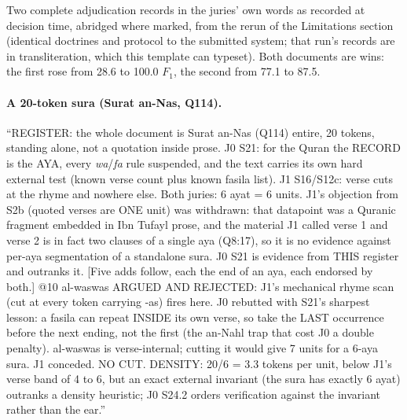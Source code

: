 \documentclass[11pt]{article}
\begin{document}
Two complete adjudication records in the juries' own words as recorded at decision
time, abridged where marked, from the rerun of the Limitations section (identical
doctrines and protocol to the submitted system; that run's records are in
transliteration, which this template can typeset). Both documents are wins: the first
rose from 28.6 to 100.0 $F_1$, the second from 77.1 to 87.5.

\paragraph{A 20-token sura (Surat an-Nas, Q114).}
\begin{tcolorbox}[colback=white, boxrule=0.4pt, left=3pt, right=3pt, top=3pt, bottom=3pt]
\scriptsize
``REGISTER: the whole document is Surat an-Nas (Q114) entire, 20 tokens, standing alone,
not a quotation inside prose. J0 S21: for the Quran the RECORD is the AYA, every
\textit{wa}/\textit{fa} rule suspended, and the text carries its own hard external test
(known verse count plus known fasila list). J1 S16/S12c: verse cuts at the rhyme and
nowhere else. Both juries: 6 ayat = 6 units. J1's objection from S2b (quoted verses are
ONE unit) was withdrawn: that datapoint was a Quranic fragment embedded in Ibn Tufayl
prose, and the material J1 called verse 1 and verse 2 is in fact two clauses of a single
aya (Q8:17), so it is no evidence against per-aya segmentation of a standalone sura. J0
S21 is evidence from THIS register and outranks it. [Five adds follow, each the end of an
aya, each endorsed by both.] @10 al-waswas ARGUED AND REJECTED: J1's mechanical rhyme
scan (cut at every token carrying -as) fires here. J0 rebutted with S21's sharpest
lesson: a fasila can repeat INSIDE its own verse, so take the LAST occurrence before the
next ending, not the first (the an-Nahl trap that cost J0 a double penalty). al-waswas is
verse-internal; cutting it would give 7 units for a 6-aya sura. J1 conceded. NO CUT.
DENSITY: 20/6 = 3.3 tokens per unit, below J1's verse band of 4 to 6, but an exact
external invariant (the sura has exactly 6 ayat) outranks a density heuristic; J0 S24.2
orders verification against the invariant rather than the ear.''
\end{tcolorbox}
\end{document}
